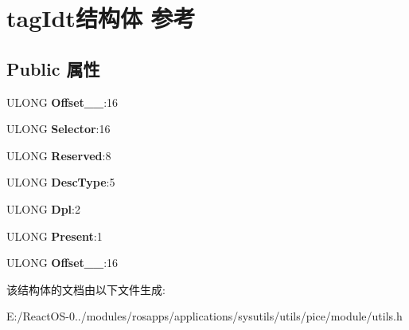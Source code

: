 \hypertarget{structtag_idt}{}\section{tag\+Idt结构体 参考}
\label{structtag_idt}
\subsection*{Public 属性}
\begin{DoxyCompactItemize}
\item 
\mbox{\label{structtag_idt_a4bce7dd5f8b67250ec3fe406c3e29338}} 
U\+L\+O\+NG {\bfseries Offset\+\_\+\_}\+:16
\item 
\mbox{\label{structtag_idt_a8fc51675db4b7020126742b760b4f8a9}} 
U\+L\+O\+NG {\bfseries Selector}\+:16
\item 
\mbox{\label{structtag_idt_a1af4b9084afbe0f325fcd174a7ad0ca1}} 
U\+L\+O\+NG {\bfseries Reserved}\+:8
\item 
\mbox{\label{structtag_idt_ab68c12e95c7a8c890e6d9ff28382686c}} 
U\+L\+O\+NG {\bfseries Desc\+Type}\+:5
\item 
\mbox{\label{structtag_idt_a26880a03850ebbaddd7cc5b87fcea4ca}} 
U\+L\+O\+NG {\bfseries Dpl}\+:2
\item 
\mbox{\label{structtag_idt_a41493b73fececd375f89a38543ad6c01}} 
U\+L\+O\+NG {\bfseries Present}\+:1
\item 
\mbox{\label{structtag_idt_a356405224c559d4766ea646044265b81}} 
U\+L\+O\+NG {\bfseries Offset\+\_\+\_}\+:16
\end{DoxyCompactItemize}


该结构体的文档由以下文件生成\+:\begin{DoxyCompactItemize}
\item 
E\+:/\+React\+O\+S-\/0../modules/rosapps/applications/sysutils/utils/pice/module/utils.\+h\end{DoxyCompactItemize}
